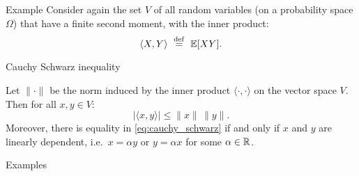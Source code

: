 \documentclass{beamer}
\begin{document}
\begin{frame}[t]{Example}
	Consider again the set $V$ of all random variables (on a probability space $\Omega$) that have a finite second moment, with the inner product:
	$$\langle X, Y \rangle \ \defeq  \ \E[XY].$$
\end{frame}

\begin{frame}[t]{Cauchy Schwarz inequality}
\begin{theorem}
	Let $\| \cdot \|$ be the norm induced by the inner product $\langle \cdot , \cdot \rangle$ on the vector space $V$. Then for all $x,y \in V$:
	\begin{equation}\label{eq:cauchy_schwarz}
	| \langle x,y \rangle | \leq \|x\| \, \|y\|.
	\end{equation}
	Moreover, there is equality in \eqref{eq:cauchy_schwarz} if and only if $x$ and $y$ are linearly dependent, i.e.\ $x = \alpha y$ or $y = \alpha x$ for some $\alpha \in \mathbb{R}$.
\end{theorem}
\end{frame}


\begin{frame}[t]{Examples}
	\pause
\end{frame}
\end{document}
